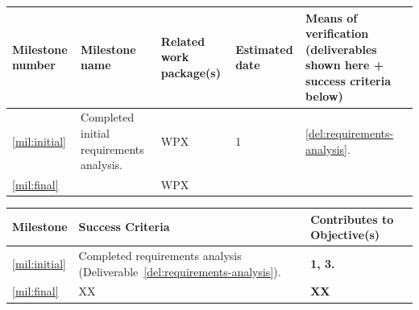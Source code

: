 \documentclass[a4paper,11pt]{article}
\begin{document}
\newpage



\label{sect:milestones}

\bigskip\bigskip\bigskip

\begin{minipage}{\textwidth}
\begin{center}
\begin{tabular*}{\textwidth}{|p{1.5cm}|p{6.7cm}|p{2.5cm}|p{1.5cm}|p{3.6cm}|}  \hline
\textbf{Milestone number} & \textbf{Milestone name} & \textbf{Related work
  package(s)} & \textbf{Estimated date} & \textbf{Means of
  verification} (deliverables shown here + success criteria below) \\
\hline
\ref{mil:initial} &
  Completed initial requirements analysis.  &
  WPX &
  1 &
\ref{del:requirements-analysis}.
\\
\ref{mil:final} &
&
WPX &
&
\\
\hline
\end{tabular*}
\end{center}
\end{minipage}

\vspace{10pt}
\begin{center}
\begin{tabular*}{\textwidth}{|p{1.5cm}|p{13.3cm}|p{1.9cm}|}\hline
\textbf{Milestone} & \textbf{Success Criteria} & \textbf{Contributes to
  Objective(s)} \\\hline
\ref{mil:initial} &
Completed requirements analysis (Deliverable~\ref{del:requirements-analysis}). &
 \textbf{1, 3.}
\\
\ref{mil:final} &
XX
& \textbf{XX}
\\\hline
\end{tabular*}
\end{center}

\end{document}
